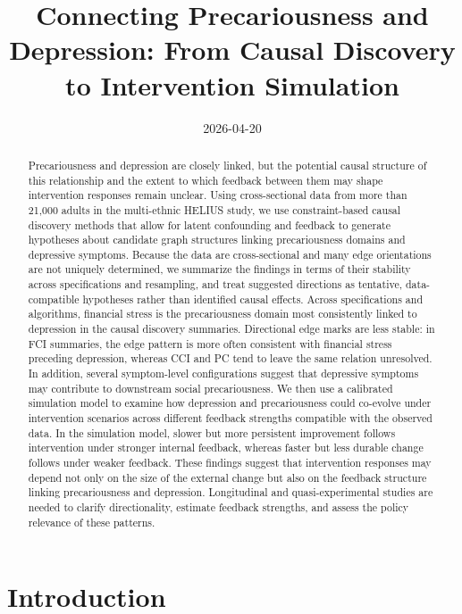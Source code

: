 \documentclass[
]{article}
\title{Connecting Precariousness and Depression: From Causal Discovery
to Intervention Simulation}
\author{%
}
\date{2026-04-20}
\begin{document}
\maketitle
\begin{abstract}
\noindent Precariousness and depression are closely linked, but the
potential causal structure of this relationship and the extent to which
feedback between them may shape intervention responses remain unclear.
Using cross-sectional data from more than 21,000 adults in the
multi-ethnic HELIUS study, we use constraint-based causal discovery
methods that allow for latent confounding and feedback to generate
hypotheses about candidate graph structures linking precariousness
domains and depressive symptoms. Because the data are cross-sectional
and many edge orientations are not uniquely determined, we summarize the
findings in terms of their stability across specifications and
resampling, and treat suggested directions as tentative, data-compatible
hypotheses rather than identified causal effects. Across specifications
and algorithms, financial stress is the precariousness domain most
consistently linked to depression in the causal discovery summaries.
Directional edge marks are less stable: in FCI summaries, the edge
pattern is more often consistent with financial stress preceding
depression, whereas CCI and PC tend to leave the same relation
unresolved. In addition, several symptom-level configurations suggest
that depressive symptoms may contribute to downstream social
precariousness. We then use a calibrated simulation model to examine how
depression and precariousness could co-evolve under intervention
scenarios across different feedback strengths compatible with the
observed data. In the simulation model, slower but more persistent
improvement follows intervention under stronger internal feedback,
whereas faster but less durable change follows under weaker feedback.
These findings suggest that intervention responses may depend not only
on the size of the external change but also on the feedback structure
linking precariousness and depression. Longitudinal and
quasi-experimental studies are needed to clarify directionality,
estimate feedback strengths, and assess the policy relevance of these
patterns.
\end{abstract}


\section{Introduction}\label{introduction}
\end{document}
